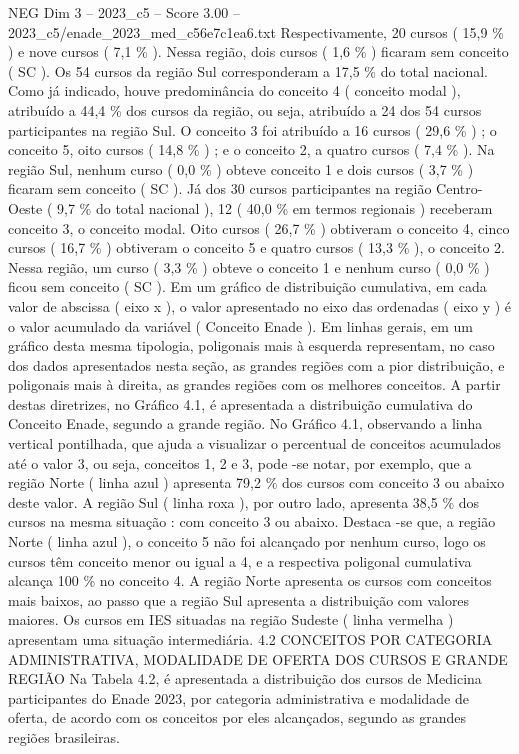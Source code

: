 \begin{textsample}{NEG Dim 3 – 2023\_c5 – Score 3.00 – 2023\_c5/enade\_2023\_med\_c56e7c1ea6.txt}
Respectivamente, 20 cursos ( 15,9 \% ) e nove cursos ( 7,1 \% ).
Nessa região, dois cursos ( 1,6 \% ) ficaram sem conceito ( SC ).
Os 54 cursos da região Sul corresponderam a 17,5 \% do total nacional.
Como já indicado, houve predominância do conceito 4 ( conceito modal ), atribuído a 44,4 \% dos cursos da região, ou seja, atribuído a 24 dos 54 cursos participantes na região Sul.
O conceito 3 foi atribuído a 16 cursos ( 29,6 \% ) ; o conceito 5, oito cursos ( 14,8 \% ) ; e o conceito 2, a quatro cursos ( 7,4 \% ).
Na região Sul, nenhum curso ( 0,0 \% ) obteve conceito 1 e dois cursos ( 3,7 \% ) ficaram sem conceito ( SC ).
Já dos 30 cursos participantes na região Centro-Oeste ( 9,7 \% do total nacional ), 12 ( 40,0 \% em termos regionais ) receberam conceito 3, o conceito modal.
Oito cursos ( 26,7 \% ) obtiveram o conceito 4, cinco cursos ( 16,7 \% ) obtiveram o conceito 5 e quatro cursos ( 13,3 \% ), o conceito 2.
Nessa região, um curso ( 3,3 \% ) obteve o conceito 1 e nenhum curso ( 0,0 \% ) ficou sem conceito ( SC ).
Em um gráfico de distribuição cumulativa, em cada valor de abscissa ( eixo x ), o valor apresentado no eixo das ordenadas ( eixo y ) é o valor acumulado da variável ( Conceito Enade ).
Em linhas gerais, em um gráfico desta mesma tipologia, poligonais mais à esquerda representam, no caso dos dados apresentados nesta seção, as grandes regiões com a pior distribuição, e poligonais mais à direita, as grandes regiões com os melhores conceitos.
A partir destas diretrizes, no Gráfico 4.1, é apresentada a distribuição cumulativa do Conceito Enade, segundo a grande região.
No Gráfico 4.1, observando a linha vertical pontilhada, que ajuda a visualizar o percentual de conceitos acumulados até o valor 3, ou seja, conceitos 1, 2 e 3, pode -se notar, por exemplo, que a região Norte ( linha azul ) apresenta 79,2 \% dos cursos com conceito 3 ou abaixo deste valor.
A região Sul ( linha roxa ), por outro lado, apresenta 38,5 \% dos cursos na mesma situação : com conceito 3 ou abaixo.
Destaca -se que, a região Norte ( linha azul ), o conceito 5 não foi alcançado por nenhum curso, logo os cursos têm conceito menor ou igual a 4, e a respectiva poligonal cumulativa alcança 100 \% no conceito 4.
A região Norte apresenta os cursos com conceitos mais baixos, ao passo que a região Sul apresenta a distribuição com valores maiores.
Os cursos em IES situadas na região Sudeste ( linha vermelha ) apresentam uma situação intermediária. 4.2 CONCEITOS POR CATEGORIA ADMINISTRATIVA, MODALIDADE DE OFERTA DOS CURSOS E GRANDE REGIÃO Na Tabela 4.2, é apresentada a distribuição dos cursos de Medicina participantes do Enade 2023, por categoria administrativa e modalidade de oferta, de acordo com os conceitos por eles alcançados, segundo as grandes regiões brasileiras.

\end{textsample}
